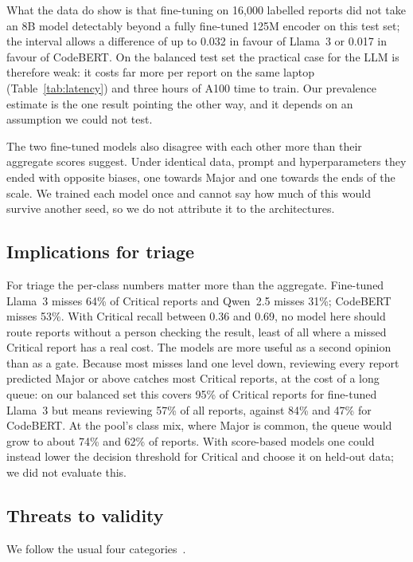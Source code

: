 \documentclass[a4paper,fleqn]{cas-sc}
\begin{document}
What the data do show is that fine-tuning on 16,000 labelled reports did not take an 8B
model detectably beyond a fully fine-tuned 125M encoder on this test set; the interval
allows a difference of up to 0.032 in favour of Llama~3 or 0.017 in favour of CodeBERT.
On the balanced test set the
practical case for the LLM is therefore weak: it costs far more per report on the same
laptop (Table~\ref{tab:latency}) and three hours of A100 time to train. Our prevalence
estimate is the one result pointing the other way, and it depends on an assumption we
could not test.

The two fine-tuned models also disagree with each other more than their aggregate
scores suggest. Under identical data, prompt and hyperparameters they ended with
opposite biases, one towards Major and one towards the ends of the scale. We trained each model once and cannot say how much of
this would survive another seed, so we do not attribute it to the architectures.

\subsection{Implications for triage}

For triage the per-class numbers matter more than the aggregate. Fine-tuned Llama~3
misses 64\% of Critical reports and Qwen~2.5 misses 31\%; CodeBERT misses 53\%. With
Critical recall between 0.36 and 0.69, no model here should route reports without a
person checking the result, least of all where a missed Critical report has a real
cost. The models are more useful as a second opinion than as a gate. Because most
misses land one level down, reviewing every report predicted Major or above catches
most Critical reports, at the cost of a long queue: on our balanced set this covers
95\% of Critical reports for fine-tuned Llama~3 but means reviewing 57\% of all
reports, against 84\% and 47\% for CodeBERT. At the pool's class mix, where Major is
common, the queue would grow to about 74\% and 62\% of reports. With score-based models one could instead
lower the decision threshold for Critical and choose it on held-out data; we did not
evaluate this.

\subsection{Threats to validity}
\label{sec:threats}

We follow the usual four categories~\citep{wohlin2012experimentation}.
\end{document}
